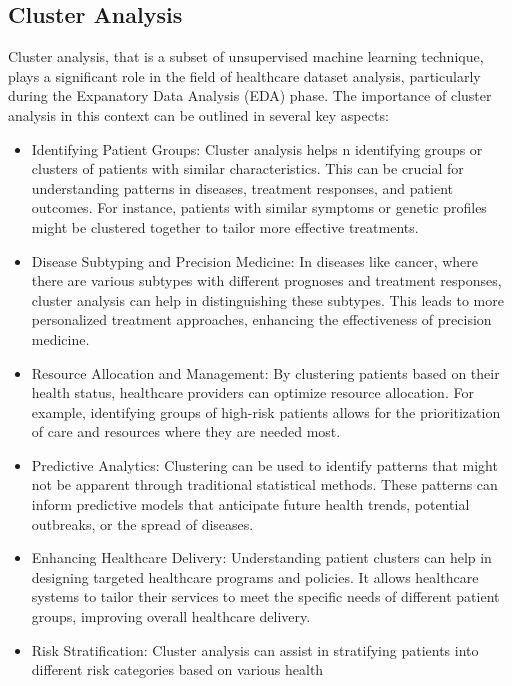 \documentclass[
]{article}
\begin{document}
\subsection{Cluster Analysis}\label{cluster-analysis}

Cluster analysis, that is a subset of unsupervised machine learning
technique, plays a significant role in the field of healthcare dataset
analysis, particularly during the Expanatory Data Analysis (EDA) phase.
The importance of cluster analysis in this context can be outlined in
several key aspects:

\begin{itemize}
\item
  Identifying Patient Groups: Cluster analysis helps n identifying
  groups or clusters of patients with similar characteristics. This can
  be crucial for understanding patterns in diseases, treatment
  responses, and patient outcomes. For instance, patients with similar
  symptoms or genetic profiles might be clustered together to tailor
  more effective treatments.
\item
  Disease Subtyping and Precision Medicine: In diseases like cancer,
  where there are various subtypes with different prognoses and
  treatment responses, cluster analysis can help in distinguishing these
  subtypes. This leads to more personalized treatment approaches,
  enhancing the effectiveness of precision medicine.
\item
  Resource Allocation and Management: By clustering patients based on
  their health status, healthcare providers can optimize resource
  allocation. For example, identifying groups of high-risk patients
  allows for the prioritization of care and resources where they are
  needed most.
\item
  Predictive Analytics: Clustering can be used to identify patterns that
  might not be apparent through traditional statistical methods. These
  patterns can inform predictive models that anticipate future health
  trends, potential outbreaks, or the spread of diseases.
\item
  Enhancing Healthcare Delivery: Understanding patient clusters can help
  in designing targeted healthcare programs and policies. It allows
  healthcare systems to tailor their services to meet the specific needs
  of different patient groups, improving overall healthcare delivery.
\item
  Risk Stratification: Cluster analysis can assist in stratifying
  patients into different risk categories based on various health

\end{itemize}
\end{document}
